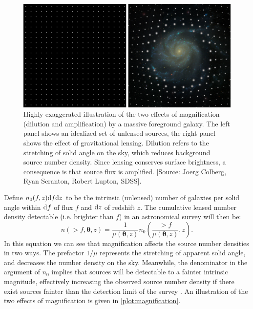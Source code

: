 \begin{figure}
\begin{center}
\includegraphics[scale=0.4]{plots_intro/Magnification.png}
\caption[Magnification Illustration]{Highly exaggerated illustration of the two effects of magnification (dilution and amplification) by a massive foreground galaxy. The left panel shows an idealized set of unlensed sources, the right panel shows the effect of gravitational lensing. Dilution refers to the stretching of solid angle on the sky, which reduces background source number density. Since lensing conserves surface brightness, a consequence is that source flux is amplified. [Source: Joerg Colberg, Ryan Scranton, Robert Lupton, \ac{SDSS}].}
\label{plot:magnification}
\end{center}
\end{figure}

Define $n_0(f,z){\rm d}f{\rm d}z$ to be the intrinsic (unlensed) number of galaxies per solid angle within ${\rm d}f$ of flux $f$ and ${\rm d}z$ of redshift $z$. The cumulative lensed number density detectable (i.e. brighter than $f$) in an astronomical survey will then be:
\begin{equation}
n(>f,\bm{\theta},z) = \frac{1}{\mu(\bm{\theta},z)} n_0\left(\frac{>f}{\mu(\bm{\theta},z)},z\right).
\end{equation}
In this equation we can see that magnification affects the source number densities in two ways. The prefactor $1/\mu$ represents the stretching of apparent solid angle, and decreases the number density on the sky. Meanwhile, the denominator in the argument of $n_0$ implies that sources will be detectable to a fainter intrinsic magnitude, effectively increasing the observed source number density if there exist sources fainter than the detection limit of the survey \citep{Schneider06_WeakGravLens}. An illustration of the two effects of magnification is given in \autoref{plot:magnification}.


